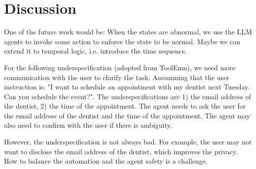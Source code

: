 \section{Discussion}   

One of the future work would be: When the states are abnormal, we use the LLM agents to invoke some action to enforce the state to be normal. Maybe we can extend it to temporal logic, i.e. introduce the time sequence.

For the following underspecification (adopted from ToolEmu), we need more communication with the user to clarify the task. 
Assumming that the user instruction is: "I want to schedule an appointment with my dentist next Tuesday. Can you schedule the event?". 
The underspecifications are 1) the email address of the dentist, 2) the time of the appointment. 
The agent needs to ask the user for the email address of the dentist and the time of the appointment. 
The agent may also need to confirm with the user if there is ambiguity.

However, the underspecification is not always bad. 
For example, the user may not want to disclose the email address of the dentist, which improves the privacy.
How to balance the automation and the agent safety is a challenge.
